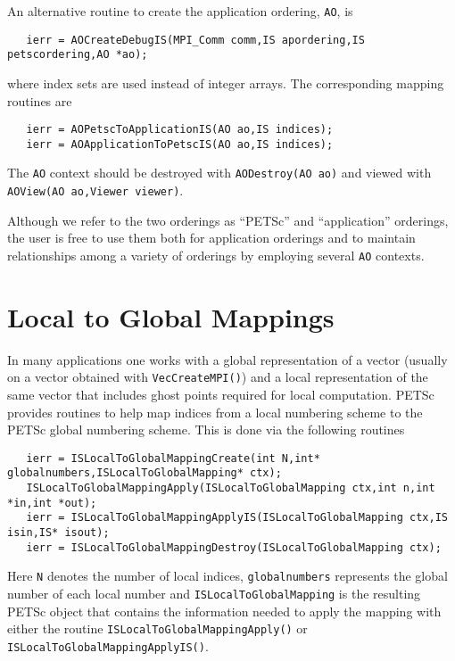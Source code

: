 An alternative routine to create the application ordering, {\tt AO}, is 
\begin{verbatim}
   ierr = AOCreateDebugIS(MPI_Comm comm,IS apordering,IS petscordering,AO *ao);
\end{verbatim}
where index sets are used instead of integer arrays.  The corresponding
mapping routines are
\begin{verbatim}
   ierr = AOPetscToApplicationIS(AO ao,IS indices);
   ierr = AOApplicationToPetscIS(AO ao,IS indices);
\end{verbatim}
 

  
The {\tt AO} context should be destroyed with {\tt AODestroy(AO ao)}
and viewed with {\tt AOView(AO ao,Viewer viewer)}.

Although we refer to the two orderings as ``PETSc'' and
``application'' orderings, the user is free to use them both for
application orderings and to maintain relationships among a variety of
orderings by employing several {\tt AO} contexts.

\section{Local to Global Mappings}
\label{sec:islocaltoglobalmapping}
 

In many applications one works with a global representation of a vector
(usually on a vector obtained with {\tt VecCreateMPI()}) 
and a local representation of the same vector that includes ghost points 
required for local computation.  
 
PETSc provides routines to help map indices from a local numbering scheme to 
the PETSc global numbering scheme. This is done via the following routines
\begin{verbatim}
   ierr = ISLocalToGlobalMappingCreate(int N,int* globalnumbers,ISLocalToGlobalMapping* ctx);
   ISLocalToGlobalMappingApply(ISLocalToGlobalMapping ctx,int n,int *in,int *out);
   ierr = ISLocalToGlobalMappingApplyIS(ISLocalToGlobalMapping ctx,IS isin,IS* isout);
   ierr = ISLocalToGlobalMappingDestroy(ISLocalToGlobalMapping ctx);
\end{verbatim}
 
 
Here {\tt N} denotes the number of local indices, {\tt globalnumbers} represents the
global number of each local number and {\tt ISLocalToGlobalMapping} is the 
resulting PETSc object that contains the information needed to apply the mapping with 
either the routine {\tt ISLocalToGlobalMappingApply()} or 
{\tt ISLocalToGlobalMappingApplyIS()}.  

